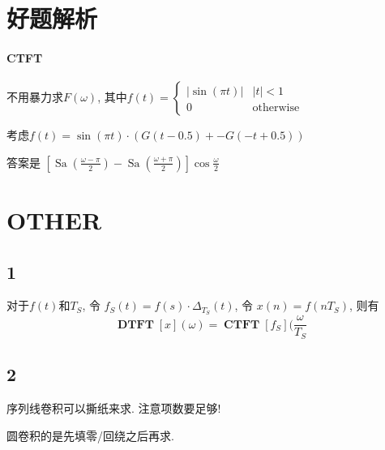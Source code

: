 \documentclass{ctexart}
\DeclareMathOperator{\CTFT}{\mathbf{CTFT}}
\DeclareMathOperator{\DTFT}{\mathbf{DTFT}}
\DeclareMathOperator{\Sa}{\mathrm{Sa}}
\begin{document}
\pagebreak
\section{好题解析}
\paragraph{CTFT} 不用暴力求$F(\omega)$, 其中$f(t) = \begin{cases} |\sin(\pi t)| & |t| < 1\\ 0 & \text{otherwise} \end{cases}$\par
    考虑$f(t) = \sin(\pi t) \cdot \left( G(t-0.5) + -G(-t+0.5) \right)$\par
    答案是 $\left[\Sa\left(\frac{\omega - \pi}{2}\right) - \Sa\left(\frac{\omega + \pi}{2}\right)\right] \cos \frac{\omega}{2}$

\section{OTHER}
\subsection{1}
对于$f(t)$和$T_S$, 令 $f_S(t) = f(s) \cdot \Delta_{T_S}(t)$, 令 $ x(n) = f(nT_S)$, 则有 \[
    \DTFT[x](\omega) = \CTFT[f_S](\frac{\omega}{T_S}
    \]
\subsection{2}
    序列线卷积可以撕纸来求. 注意项数要足够!\par
    圆卷积的是先填零/回绕之后再求.
\end{document}
